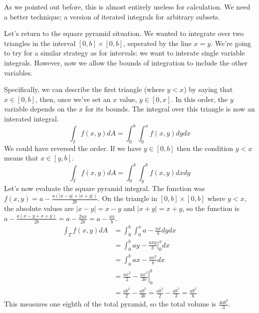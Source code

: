\documentclass[fleqn,letterpaper]{report}
\begin{document}
As we pointed out before, this is almost entirely useless for
calculation. We need a better technique; a version of
iterated integrals for arbitrary subsets.

\begin{example}
Let's return to the square pyramid situation. We wanted to
integrate over two triangles in the interval $[0,b] \times
[0,b]$, seperated by the line $x=y$. We're going to try for a
similar strategy as for intervals: we want to interate single
variable integrals. However, now we allow the bounds of
integration to include the other variables.

Specifically, we can describe the first triangle (where $y<x$)
by saying that $x \in [0,b]$, then, once we've set an $x$
value, $y \in [0, x]$. In this order, the $y$ variable
depends on the $x$ for its bounds. The integral over this
triangle is now an interated integral.
\begin{equation*}
\int_I f(x,y) dA = \int_0^b \int_0^x f(x,y) dy dx
\end{equation*}
We could have reversed the order. If we have $y \in [0,b]$
then the condition $y<x$ means that $x \in [y,b]$.
\begin{equation*}
\int_I f(x,y) dA = \int_0^b \int_y^b f(x,y) dx dy
\end{equation*}
Let's now evaluate the square pyramid integral.
The function was $f(x,y) = a - \frac{a(|x-y| + |x+y|)}{2b}$.
On the triangle in $[0,b] \times [0,b]$ where $y<x$, the
absolute values are $|x-y| = x-y$ and $|x+y| = x+y$, so
the function is $a - \frac{a(x-y+x+y)}{2b} = a -
\frac{2ax}{2b} = a - \frac{ax}{b}$.
\begin{align*}
\int_T f(x,y) dA & = \int_0^b \int_0^x a - \frac{ax}{b} dy dx
\\
& = \int_0^b \left. ay - \frac{axy}{b} \right|_0^x dx \\
& = \int_0^b ax - \frac{ax^2}{b} dx \\
& = \left. \frac{ax^2}{2} - \frac{ax^3}{3b} \right|_0^b \\
& = \frac{ab^2}{2} - \frac{ab^3}{3b} = \frac{ab^2}{2} -
\frac{ab^2}{3} = \frac{ab^2}{6}
\end{align*}
This measures one eighth of the total pyramid, so the total
volume is $\frac{4ab^2}{3}$.
\end{example}
\newpage
\end{document}
